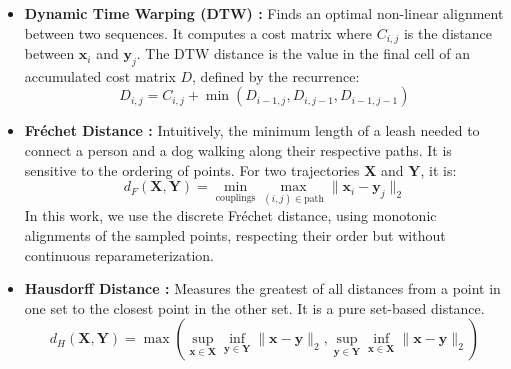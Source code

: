 \documentclass[a4paper,12pt]{article}
\begin{document}
    \begin{itemize}
        \item \textbf{Dynamic Time Warping (DTW) \cite{SalvadorChan2007}:} Finds an optimal non-linear alignment between two sequences. It computes a cost matrix where $C_{i,j}$ is the distance between $\mathbf{x}_i$ and $\mathbf{y}_j$. The DTW distance is the value in the final cell of an accumulated cost matrix $D$, defined by the recurrence:
        \begin{equation}
            D_{i,j} = C_{i,j} + \min(D_{i-1, j}, D_{i, j-1}, D_{i-1, j-1})
        \end{equation}
        \item \textbf{Fréchet Distance \cite{Denaxas2023} \cite{EiterMannila1994}:} Intuitively, the minimum length of a leash needed to connect a person and a dog walking along their respective paths. It is sensitive to the ordering of points. For two trajectories $\mathbf{X}$ and $\mathbf{Y}$, it is:
            \begin{equation}
                d_F(\mathbf{X}, \mathbf{Y}) = \min_{\text{couplings}} \max_{(i, j) \in \text{path}} \| \mathbf{x}_i - \mathbf{y}_j \|_2
            \end{equation}
            In this work, we use the discrete Fréchet distance, using monotonic alignments of the sampled points, respecting their order but without continuous reparameterization.
        \item \textbf{Hausdorff Distance \cite{SciPyDirectedHausdorff}:} Measures the greatest of all distances from a point in one set to the closest point in the other set. It is a pure set-based distance.
        \begin{equation}
            d_H(\mathbf{X}, \mathbf{Y}) = \max \left( \sup_{\mathbf{x} \in \mathbf{X}} \inf_{\mathbf{y} \in \mathbf{Y}} \|\mathbf{x}-\mathbf{y}\|_2, \sup_{\mathbf{y} \in \mathbf{Y}} \inf_{\mathbf{x} \in \mathbf{X}} \|\mathbf{x}-\mathbf{y}\|_2 \right)
        \end{equation}


\end{itemize}
\end{document}
